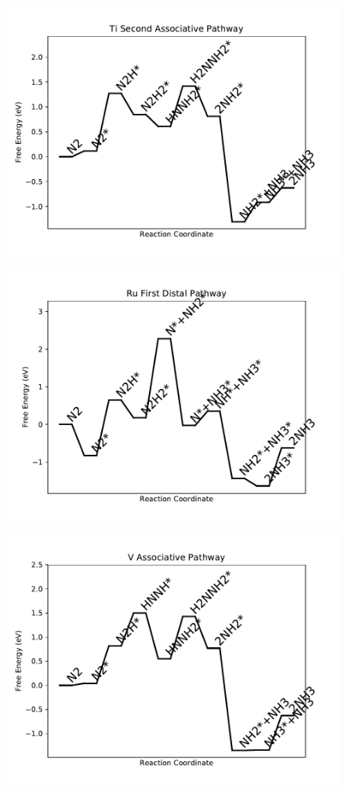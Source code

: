 \begin{figure}
\includegraphics[width=0.8\linewidth]{data/plots/Ti_associative_2.pdf}
\label{fig:Ti_associative_2}
\end{figure}

\begin{figure}
\includegraphics[width=0.8\linewidth]{data/plots/Ru_distal_1.pdf}
\label{fig:Ru_distal_1}
\end{figure}

\begin{figure}
\includegraphics[width=0.8\linewidth]{data/plots/V_associative.pdf}
\label{fig:V_associative}
\end{figure}

